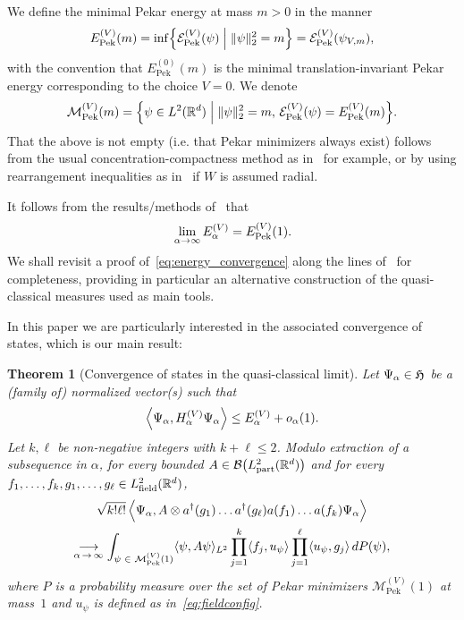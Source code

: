 \documentclass[10pt]{amsart}
\newtheorem{theo}{Theorem}[section]
\theoremstyle{definition}\newtheorem{defi}[theo]{Definition}\newtheorem{rema}[theo]{Remark}\newtheorem{exam}[theo]{Example}\newtheorem{exem}[theo]{Example}\newtheorem{nota}[theo]{Notation}
\DeclareMathOperator{\Pek}{Pek}
\DeclareMathOperator{\partt}{part}
\DeclareMathOperator{\field}{field}
\newcommand{\R}{\mathbb{R}}
\newcommand{\gH}{\mathfrak{H}}
\newcommand{\cB}{\mathcal{B}}
\newcommand{\cE}{\mathcal{E}}
\newcommand{\cM}{\mathcal{M}}
\newcommand{\1}{\mathds{1}}
\let\oldin\in
\renewcommand{\in}{\mathchoice{\oldin}{\oldin}{\,\oldin\,}{\,\oldin\,}}
\renewcommand*{\to}{\mathchoice{\longrightarrow}{\rightarrow}{\rightarrow}{\rightarrow}}
\let\originalleft\left
\let\originalright\right
\renewcommand{\left}{\mathopen{}\mathclose\bgroup\originalleft}
\renewcommand{\right}{\aftergroup\egroup\originalright}
\begin{document}
We define the minimal Pekar energy at mass $m >0$ in the manner
\begin{equation}\label{eq:pekar_energy}
E_{\Pek}^{(V)}(m)=\inf\left\{ \cE^{(V)}_{\Pek}(\psi)\;\middle|\;\|\psi\|_{2}^2=m \right\} = \cE_{\Pek}^{(V)}\left(\psi_{V,m} \right),
\end{equation}
with the convention that $E_{\Pek}^{(0)}(m)$ is the minimal translation-invariant Pekar energy corresponding to the choice $V=0$. We denote
\begin{equation}\label{eq:minimizers}
\cM _{\Pek}^{(V)}(m) = \left\{\psi\in L^2 (\R^d)\;\middle|\; \|\psi\|_{2}^2=m,\, \cE_{\Pek}^{(V)}\left(\psi \right) = E_{\Pek}^{(V)}(m) \right\}.
\end{equation}
That the above is not empty (i.e. that Pekar minimizers always exist) follows from the usual concentration-compactness method as in~\cite{FroJonLen-07b,LewRou-13b,Ricaud-14} for example, or by using rearrangement inequalities as in~\cite{Lieb-77} if $W$ is assumed radial.


It follows from the results/methods of~\cite{CorFalOli-20,DonVar-83,LieTho-97} that
\begin{equation}\label{eq:energy_convergence}
\lim_{\alpha\to\infty} E^{(V)}_\alpha =E^{(V)}_{\Pek}(1).
\end{equation}
We shall revisit a proof of~\eqref{eq:energy_convergence} along the lines of~\cite{CorFalOli-20} for completeness, providing in particular an alternative construction of the quasi-classical measures used as main tools.

In this paper we are particularly interested in the associated convergence of states, which is our main result:



\begin{theo}[{Convergence of states in the quasi-classical limit}]\label{thm:main}
Let $\Psi_\alpha \in \gH$ be a (family of) normalized vector(s) such that
\begin{equation}\label{eq:minimizing_sequence}
\left\langle \Psi_\alpha, H^{(V)}_\alpha\Psi_\alpha\right\rangle\le E^{(V)}_\alpha+o_\alpha(1).
\end{equation}
Let $k,\ell$ be non-negative integers with $k+\ell \leq 2$. Modulo extraction of a subsequence in $\alpha$, for every bounded $A\in \cB\big(L^2_{\partt}(\R^d) \big)$ and for every $f_1,\dots,f_k,g_1,\dots,g_\ell\in L^2_{\field}(\R^d)$,
\begin{multline}\label{eq:mainCV}
\sqrt{k!\ell!}\, \Big\langle \Psi_\alpha, A \otimes a^\dagger(g_1)\dots a^\dagger(g_\ell) a(f_1)\dots a(f_k) \Psi_\alpha \Big \rangle  \\
\underset{\alpha\,\to\,\infty}{\to}\int_{\psi \in \cM _{\Pek}^{(V)}(1)} \langle \psi, A \psi \rangle_{L^2} \prod_{j=1}^k\langle f_j,u_\psi \rangle \prod_{j=1}^\ell\langle u_\psi, g_j\rangle\,dP(\psi),
\end{multline}
where $P$ is a probability measure over the set of Pekar minimizers $\cM _{\Pek}^{(V)}(1)$ at mass~$1$ and $u_\psi$ is defined as in~\eqref{eq:fieldconfig}.
\end{theo}
\end{document}
